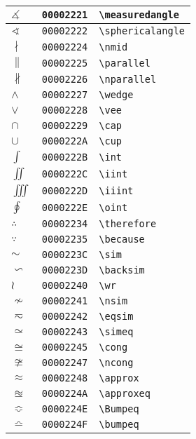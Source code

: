 \begin{longtable}{|l|l|l|}
\hline
$\measuredangle$ & \texttt{00002221} & \verb|\measuredangle| \\
\hline
$\sphericalangle$ & \texttt{00002222} & \verb|\sphericalangle| \\
\hline
$\nmid$ & \texttt{00002224} & \verb|\nmid| \\
\hline
$\parallel$ & \texttt{00002225} & \verb|\parallel| \\
\hline
$\nparallel$ & \texttt{00002226} & \verb|\nparallel| \\
\hline
$\wedge$ & \texttt{00002227} & \verb|\wedge| \\
\hline
$\vee$ & \texttt{00002228} & \verb|\vee| \\
\hline
$\cap$ & \texttt{00002229} & \verb|\cap| \\
\hline
$\cup$ & \texttt{0000222A} & \verb|\cup| \\
\hline
$\int$ & \texttt{0000222B} & \verb|\int| \\
\hline
$\iint$ & \texttt{0000222C} & \verb|\iint| \\
\hline
$\iiint$ & \texttt{0000222D} & \verb|\iiint| \\
\hline
$\oint$ & \texttt{0000222E} & \verb|\oint| \\
\hline
$\therefore$ & \texttt{00002234} & \verb|\therefore| \\
\hline
$\because$ & \texttt{00002235} & \verb|\because| \\
\hline
$\sim$ & \texttt{0000223C} & \verb|\sim| \\
\hline
$\backsim$ & \texttt{0000223D} & \verb|\backsim| \\
\hline
$\wr$ & \texttt{00002240} & \verb|\wr| \\
\hline
$\nsim$ & \texttt{00002241} & \verb|\nsim| \\
\hline
$\eqsim$ & \texttt{00002242} & \verb|\eqsim| \\
\hline
$\simeq$ & \texttt{00002243} & \verb|\simeq| \\
\hline
$\cong$ & \texttt{00002245} & \verb|\cong| \\
\hline
$\ncong$ & \texttt{00002247} & \verb|\ncong| \\
\hline
$\approx$ & \texttt{00002248} & \verb|\approx| \\
\hline
$\approxeq$ & \texttt{0000224A} & \verb|\approxeq| \\
\hline
$\Bumpeq$ & \texttt{0000224E} & \verb|\Bumpeq| \\
\hline
$\bumpeq$ & \texttt{0000224F} & \verb|\bumpeq| \\

\end{longtable}
